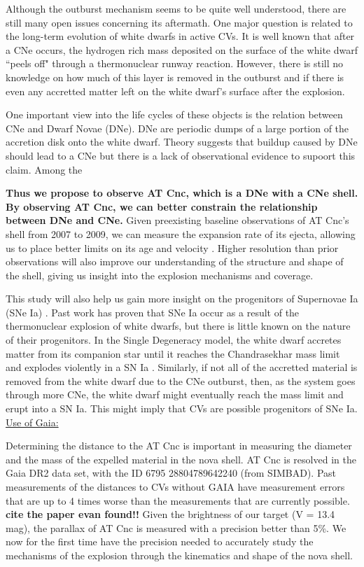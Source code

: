 \documentclass[11pt,a4paper]{article}  %
\begin{document}
Although the outburst mechanism seems to be quite well understood, there are still many open issues concerning its aftermath. One major question is related to the long-term evolution of white dwarfs in active CVs. It is well known that after a CNe occurs, the hydrogen rich mass deposited on the surface of the white dwarf ``peels off" through a thermonuclear runway reaction. However, there is still no knowledge on how much of this layer is removed in the outburst and if there is even any accretted matter left on the white dwarf's surface after the explosion. 

One important view into the life cycles of these objects is the relation between CNe and Dwarf Novae (DNe). DNe are periodic dumps of a large portion of the accretion disk onto the white dwarf. Theory suggests that buildup caused by DNe should lead to a CNe but there is a lack of observational evidence to supoort this claim. Among the 

\textbf{Thus we propose to observe AT Cnc, which is a DNe with a CNe shell. By observing AT Cnc, we can better constrain the relationship between DNe and CNe.} Given preexisting baseline observations of AT Cnc's shell from 2007 to 2009, we can measure the expansion rate of its ejecta, allowing us to place better limits on its age and velocity \cite{shara2012atcnc}. Higher resolution than prior observations will also improve our understanding of the structure and shape of the shell, giving us insight into the explosion mechanisms and coverage. 

This study will also help us gain more insight on the progenitors of Supernovae Ia (SNe Ia) \cite{wang2012progenitors}. Past work has proven that SNe Ia occur as a result of the thermonuclear explosion of white dwarfs, but there is little known on the nature of their progenitors. In the Single Degeneracy model, the white dwarf accretes matter from its companion star until it reaches the Chandrasekhar mass limit and explodes violently in a SN Ia  \cite{whelan1973binaries}. Similarly, if not all of the accretted material is removed from the white dwarf due to the CNe outburst, then, as the system goes through more CNe, the white dwarf might eventually reach the mass limit and erupt into a SN Ia. This might imply that CVs are possible progenitors of SNe Ia. 
\vspace{1mm} \\
\noindent \underline{Use of Gaia:} 
\par Determining the distance to the AT Cnc is important in measuring the diameter and the mass of the expelled material in the nova shell. AT Cnc is resolved in the Gaia DR2 data set, with the ID 6795 28804789642240 (from SIMBAD). Past measurements of the distances to CVs without GAIA have measurement errors that are up to 4 times worse than the measurements that are currently possible. \textbf{cite the paper evan found!!} Given the brightness of our target (V = 13.4 mag), the parallax of AT Cnc is measured with a precision better than 5\%. We now for the first time have the precision needed to accurately study the mechanisms of the explosion through the kinematics and shape of the nova shell.  %
\end{document}
